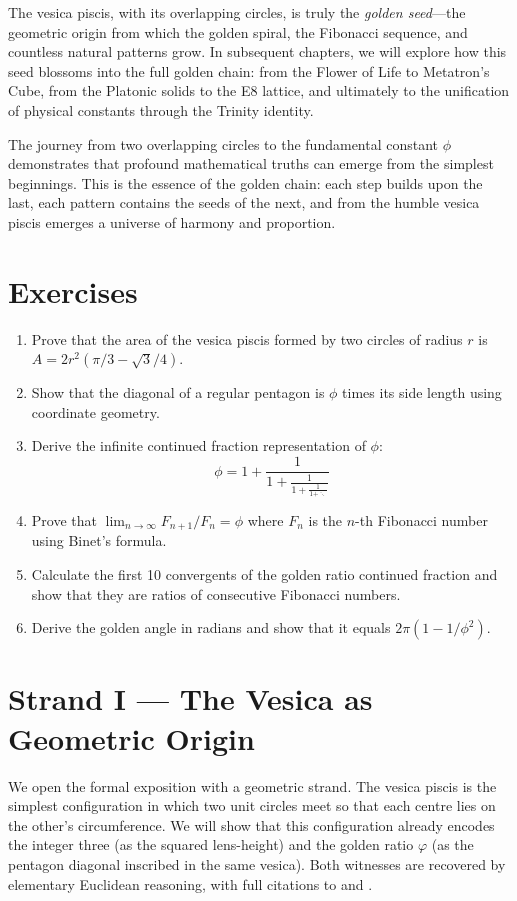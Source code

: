 The vesica piscis, with its overlapping circles, is truly the \emph{golden seed}—the geometric origin from which the golden spiral, the Fibonacci sequence, and countless natural patterns grow. In subsequent chapters, we will explore how this seed blossoms into the full golden chain: from the Flower of Life to Metatron's Cube, from the Platonic solids to the E8 lattice, and ultimately to the unification of physical constants through the Trinity identity.

The journey from two overlapping circles to the fundamental constant $\phi$ demonstrates that profound mathematical truths can emerge from the simplest beginnings. This is the essence of the golden chain: each step builds upon the last, each pattern contains the seeds of the next, and from the humble vesica piscis emerges a universe of harmony and proportion.

\section{Exercises}

\begin{enumerate}
    \item Prove that the area of the vesica piscis formed by two circles of radius $r$ is $A = 2r^2(\pi/3 - \sqrt{3}/4)$.
    \item Show that the diagonal of a regular pentagon is $\phi$ times its side length using coordinate geometry.
    \item Derive the infinite continued fraction representation of $\phi$:
    \[
    \phi = 1 + \frac{1}{1 + \frac{1}{1 + \frac{1}{1 + \ddots}}}
    \]
    \item Prove that $\lim_{n \to \infty} F_{n+1}/F_n = \phi$ where $F_n$ is the $n$-th Fibonacci number using Binet's formula.
    \item Calculate the first 10 convergents of the golden ratio continued fraction and show that they are ratios of consecutive Fibonacci numbers.
    \item Derive the golden angle in radians and show that it equals $2\pi(1 - 1/\phi^2)$.
\end{enumerate}


\section{Strand I --- The Vesica as Geometric Origin}
\label{fa_01:sec:01-strand-I}

We open the formal exposition with a geometric strand. The vesica
piscis is the simplest configuration in which two unit circles meet so
that each centre lies on the other's circumference. We will show that
this configuration already encodes the integer three (as the squared
lens-height) and the golden ratio $\varphi$ (as the pentagon diagonal
inscribed in the same vesica). Both witnesses are recovered by
elementary Euclidean reasoning, with full citations to
\cite{euclid_elements} and \cite{kepler_harmonices}.

